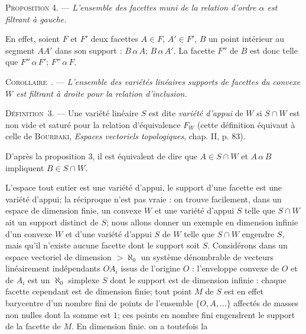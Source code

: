 \documentclass[11pt]{article}
\newcommand{\bzcf}[2]{#1}
\newcommand{\bznum}[1]{\if\relax\detokenize{#1}\relax\else\ #1\fi}
\newenvironment{defin}[1][]{\par\medskip\noindent\textsc{Définition\bznum{#1}.} --- }{\par\medskip}
\newenvironment{prop}[1][]{\par\medskip\noindent\textsc{Proposition #1.} --- \itshape}{\par\medskip}
\newenvironment{corollaire}[1][]{\par\medskip\noindent\textsc{Corollaire\bznum{#1}.} --- \itshape}{\par\medskip}
\newenvironment{proof}[1][]{\par}{\par}
\begin{document}
\begin{prop}[4]
L'ensemble des facettes muni de la relation d'ordre $\alpha$ est filtrant à gauche.
\end{prop}

\begin{proof}
En effet, soient $F$ et $F'$ deux facettes $A\in F$, $A'\in F'$, $B$ un point intérieur au
segment $AA'$ dans son support : $B\,\alpha\,A$; $B\,\alpha\,A'$. La facette $F''$ de $B$ est donc
telle que $F''\,\alpha\,F'$; $F''\,\alpha\,F$.
\end{proof}

\begin{corollaire}
L'ensemble des variétés linéaires supports de facettes du convexe $W$ est filtrant à droite pour
la relation d'inclusion.
\end{corollaire}

\begin{defin}[3]
Une variété linéaire $S$ est dite \textit{variété d'appui} de $W$ si $S\cap W$ est non vide et
saturé pour la relation d'équivalence $F_W$ (cette définition équivaut à celle de
\textsc{Bourbaki}, \textit{Espaces vectoriels topologiques}, chap. II, p. 83).
\end{defin}

D'après \bzcf{la proposition 3}{\ref{bzprop:c3s1p3_ordre_supports}}, il est équivalent de dire
que $A\in S\cap W$ et $A\,\alpha\,B$ impliquent $B\in S\cap W$.

L'espace tout entier est une variété d'appui, le support d'une facette est une variété d'appui;
la réciproque n'est pas vraie : on trouve facilement, dans un espace de dimension finie, un
convexe $W$ et une variété d'appui $S$ telle que $S\cap W$ ait un support distinct de $S$; nous
allons donner un exemple en dimension infinie d'un convexe $W$ et d'une variété d'appui $S$ de $W$
telle que $S\cap W$ engendre $S$, mais qu'il n'existe aucune facette dont le support soit $S$.
Considérons dans un espace vectoriel de dimension $>\aleph_0$ un système dénombrable de vecteurs
linéairement indépendants $OA_i$ issus de l'origine $O$ : l'enveloppe convexe de $O$ et de $A_i$
est un $\aleph_0$ simplexe $S$ dont le support est de dimension infinie : chaque facette cependant
est de dimension finie; tout point $M$ de $S$ est en effet barycentre d'un nombre fini de points
de l'ensemble $\{O, A, \ldots\}$ affectés de masses non nulles dont la somme est $1$; ces points
en nombre fini engendrent le support de la facette de $M$. En dimension finie. on a toutefois la
\end{document}
